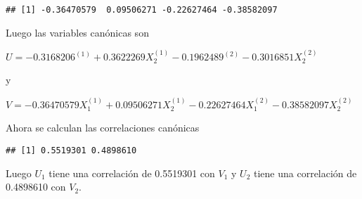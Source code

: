 \documentclass[
]{article}
\newenvironment{Shaded}{\begin{snugshade}}{\end{snugshade}}
\newcommand{\FunctionTok}[1]{\textcolor[rgb]{0.00,0.00,0.00}{#1}}
\newcommand{\NormalTok}[1]{#1}
\newcommand{\OtherTok}[1]{\textcolor[rgb]{0.56,0.35,0.01}{#1}}
\newcommand{\SpecialCharTok}[1]{\textcolor[rgb]{0.00,0.00,0.00}{#1}}
\begin{document}
\begin{verbatim}
## [1] -0.36470579  0.09506271 -0.22627464 -0.38582097
\end{verbatim}

Luego las variables canónicas son

\(U = -0.3168206^{(1)} +0.3622269X_2^{(1)}-0.1962489^{(2)}-0.3016851X_2^{(2)}\)

y

\(V = -0.36470579X_1^{(1)} +0.09506271X_2^{(1)}-0.22627464X_1^{(2)}-0.38582097X_2^{(2)}\)

Ahora se calculan las correlaciones canónicas

\begin{Shaded}
\end{Shaded}

\begin{verbatim}
## [1] 0.5519301 0.4898610
\end{verbatim}

Luego \(U_1\) tiene una correlación de 0.5519301 con \(V_1\) y \(U_2\)
tiene una correlación de 0.4898610 con \(V_2\).
\end{document}

